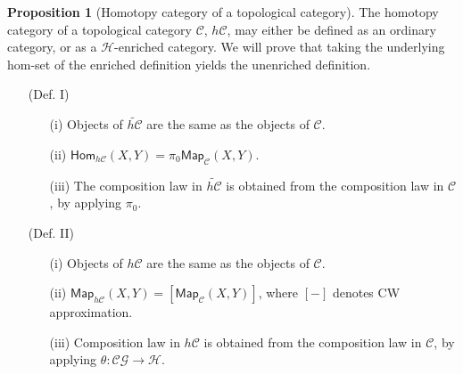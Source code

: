 \documentclass[10pt]{amsart}
\newcommand{\8}{\ensuremath{\infty}}
\newcommand{\0}{\ensuremath{\overset{\rightarrow}{0}}}
\newcommand{\1}{\ensuremath{\mathbf{1}}}
\newcommand{\C}{\ensuremath{\mathscr{C}}}
\newcommand{\CG}{\ensuremath{\mathscr{CG}}}
\renewcommand{\H}{\ensuremath{\mathcal{H}}}
\newcommand{\Hom}{\ensuremath{\mathsf{Hom}}}
\newcommand{\Map}{\ensuremath{\mathsf{Map}}}
\theoremstyle{definition}
\newtheorem{proposition}[definition]{Proposition}
\numberwithin{definition}{subsection}
\numberwithin{definition}{section}
\begin{document}
\begin{proposition}[Homotopy category of a topological category]
  The homotopy category of a topological category \C, $h\C$, may either be defined as an ordinary category, or as a \H-enriched category. We will prove that taking the underlying hom-set of the enriched definition yields the unenriched definition.

  \begin{enumerate}
    \item[(Def. I)]
      \begin{enumerate}
        \item[(i)] Objects of $\widetilde{h\C}$ are the same as the objects of \C.
        \item[(ii)] $\Hom_{h\C}(X, Y) = \pi_0 \Map_\C(X, Y)$.
        \item[(iii)] The composition law in $\widetilde{h\C}$ is obtained from the composition law in \C, by applying $\pi_0$.
      \end{enumerate}
    \item[(Def. II)]
      \begin{enumerate}
        \item[(i)] Objects of $h\C$ are the same as the objects of \C.
        \item[(ii)] $\Map_{h\C}(X, Y) = [\Map_\C(X, Y)]$, where $[-]$ denotes CW approximation.
        \item[(iii)] Composition law in $h\C$ is obtained from the composition law in \C, by applying $\theta: \CG \rightarrow \H$.
      \end{enumerate}
  \end{enumerate}
\end{proposition}
\end{document}
